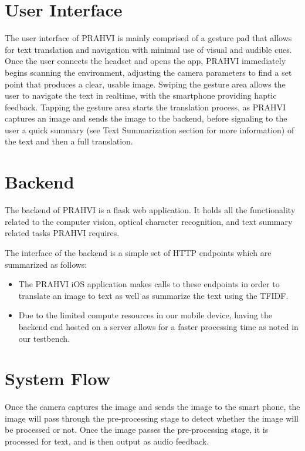 \section{User Interface}
The user interface of PRAHVI is mainly comprised of a gesture pad that allows for text translation and navigation with minimal use of visual and audible cues. Once the user connects the headset and opens the app, PRAHVI immediately begins scanning the environment, adjusting the camera parameters to find a set point that produces a clear, usable image. Swiping the gesture area allows the user to navigate the text in realtime, with the smartphone providing haptic feedback. Tapping the gesture area starts the translation process, as PRAHVI captures an image and sends the image to the backend, before signaling to the user a quick summary (see Text Summarization section for more information) of the text and then a full translation.

\section{Backend}
The backend of PRAHVI is a flask web application. It holds all the functionality related to the computer vision, optical character recognition, and text summary related tasks PRAHVI requires.

The interface of the backend is a simple set of HTTP endpoints which are summarized as follows:

\begin{itemize}
\item The PRAHVI iOS application makes calls to these endpoints in order to translate an image to text as well as summarize the text using the TFIDF.

\item Due to the limited compute resources in our mobile device, having the backend end hosted on a server allows for a faster processing time as noted in our testbench.
\end{itemize}

\section{System Flow}
Once the camera captures the image and sends the image to the smart phone, the image will pass through the pre-processing stage to detect whether the image will be processed or not. Once the image passes the pre-processing stage, it is processed for text, and is then output as audio feedback.

